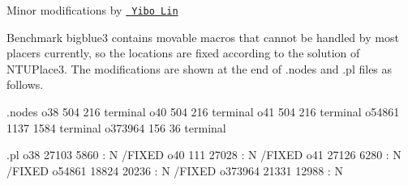 Minor modifications by \href{http://www.yibolin.com}{\texttt{ Yibo Lin}}

Benchmark bigblue3 contains movable macros that cannot be handled by most placers currently, so the locations are fixed according to the solution of N\+T\+U\+Place3. The modifications are shown at the end of .nodes and .pl files as follows. ~\newline


.nodes o38 504 216 terminal o40 504 216 terminal o41 504 216 terminal o54861 1137 1584 terminal o373964 156 36 terminal

.pl o38 27103 5860 \+: N /\+F\+I\+X\+ED o40 111 27028 \+: N /\+F\+I\+X\+ED o41 27126 6280 \+: N /\+F\+I\+X\+ED o54861 18824 20236 \+: N /\+F\+I\+X\+ED o373964 21331 12988 \+: N 